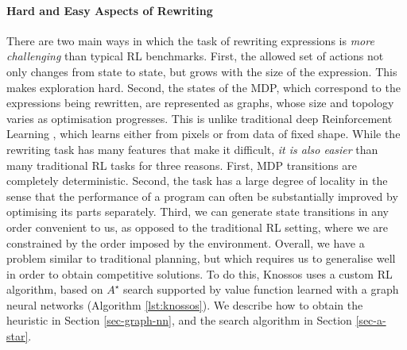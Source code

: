 \documentclass[fullpage,twocolumn]{article} %
\begin{document}
\paragraph{Hard and Easy Aspects of Rewriting} 
There are two main ways in which the task of rewriting expressions is \emph{more challenging} than typical RL benchmarks. First, the allowed set of actions not only changes from state to state, but grows with the size of the expression. This makes exploration hard. Second, the states of the MDP, which correspond to the expressions being rewritten, are represented as graphs, whose size and topology varies as optimisation progresses. This is unlike traditional deep Reinforcement Learning \citep{mnih2013playing}, which learns either from pixels or from data of fixed shape. While the rewriting task has many features that make it difficult, \emph{it is also easier} than many traditional RL tasks for three reasons. First, MDP transitions are completely deterministic. Second, the task has a large degree of locality in the sense that the performance of a program can often be substantially improved by optimising its parts separately. Third, we can generate state transitions in any order convenient to us, as opposed to the traditional RL setting, where we are constrained by the order imposed by the environment. Overall, we have a problem similar to traditional planning, but which requires us to generalise well in order to obtain competitive solutions. To do this,  Knossos uses a custom RL algorithm, based on $A^\star$ search supported by value function learned with a graph neural networks (Algorithm \ref{lst:knossos}). We describe how to obtain the heuristic in Section \ref{sec-graph-nn}, and the search algorithm in Section \ref{sec-a-star}.
\end{document}
